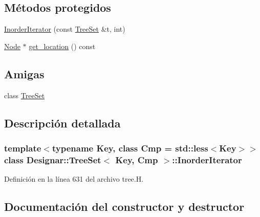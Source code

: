 \subsection*{Métodos protegidos}
\begin{DoxyCompactItemize}
\item 
\hyperlink{class_designar_1_1_tree_set_1_1_inorder_iterator_a71c23649fcff4269dd3096ce6ac10e2d}{Inorder\+Iterator} (const \hyperlink{class_designar_1_1_tree_set}{Tree\+Set} \&t, int)
\item 
\hyperlink{class_designar_1_1_tree_set_a7409a9c1545c0e9e2fd6b84120713c99}{Node} $\ast$ \hyperlink{class_designar_1_1_tree_set_1_1_inorder_iterator_a06e9a4e3d4d834c250932e3d77190b1f}{get\+\_\+location} () const
\end{DoxyCompactItemize}
\subsection*{Amigas}
\begin{DoxyCompactItemize}
\item 
class \hyperlink{class_designar_1_1_tree_set_1_1_inorder_iterator_a7caa42294700d2a60905ec3458a7cd8a}{Tree\+Set}
\end{DoxyCompactItemize}


\subsection{Descripción detallada}
\subsubsection*{template$<$typename Key, class Cmp = std\+::less$<$\+Key$>$$>$\newline
class Designar\+::\+Tree\+Set$<$ Key, Cmp $>$\+::\+Inorder\+Iterator}



Definición en la línea 631 del archivo tree.\+H.



\subsection{Documentación del constructor y destructor}
\mbox{\label{class_designar_1_1_tree_set_1_1_inorder_iterator_a71c23649fcff4269dd3096ce6ac10e2d}} 
